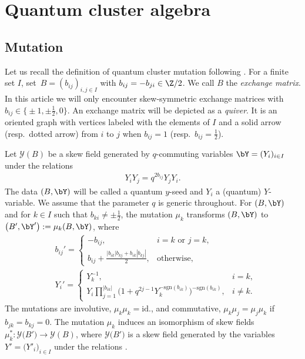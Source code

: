 \section{Quantum cluster algebra}\label{s:qca}

\subsection{Mutation}\label{ss:mutation}

Let us recall the definition of quantum cluster mutation following \cite{FG06}.
For a finite set $I$, set~${B = (b_{ij})_{i,j \in I}}$ with
$b_{ij} = -b_{ji} \in \Z/2$. We call $B$ the {\it exchange matrix}.
In this article we will only encounter skew-symmetric exchange matrices
with $b_{ij} \in \bigl\{\pm 1, \pm \frac{1}{2},0\bigr\}$. An exchange matrix
will be depicted as a {\em quiver}. It is an oriented graph
with vertices labeled with the elements of $I$ and a solid arrow
(resp.\ dotted arrow) from $i$ to $j$ when $b_{ij}=1$ \big(resp.\
$b_{ij}=\frac{1}{2}$\big).

Let $\mathcal{Y}(B)$ be a skew field generated by $q$-commuting variables
$\bY = (Y_i)_{i \in I}$ under the relations
\begin{align}\label{yyq}
 Y_i Y_j = q^{2b_{ij}} Y_j Y_i.
\end{align}
The data $(B, \bY)$ will be called a quantum $y$-seed and $Y_i$ a (quantum) $Y$-variable.
We assume that the parameter $q$ is generic throughout.
%
For $(B, \bY)$ and for $k \in I$ such that
$b_{ki} \neq \pm \frac{1}{2}$, the mutation $\mu_k$ transforms
$(B, \bY)$ to $\bigl(B', \bY'\bigr) := \mu_k (B,\bY)$, where
\begin{align}\label{muB}
 &b_{ij}' =
 \begin{cases}
 -b_{ij}, & i=k \text{ or } j=k,
 \\
 \displaystyle{b_{ij} + \frac{|b_{ik}| b_{kj} + b_{ik} |b_{kj}|}{2}},
 & \text{otherwise},
 \end{cases}
 \\ \label{muY}
%
 &Y_{i}' =
 \begin{cases}
 Y_k^{-1}, & i=k,
 \\
 \displaystyle{Y_i \prod_{j=1}^{|b_{ik}|}\bigl(1 + q^{2j-1} Y_k^{-\mathrm{sgn}(b_{ik})}\bigr)^{-\mathrm{sgn}(b_{ik})}}, & i \neq k.
 \end{cases}
\end{align}
The mutations are involutive, $\mu_k \mu_k = \mathrm{id.}$, and
commutative, $\mu_k \mu_j = \mu_j \mu_k$ if $b_{jk}=b_{kj}=0$. The
mutation $\mu_k$ induces an isomorphism of skew fields
$\mu_k^{\ast}\colon \mathcal{Y}\bigl(B'\bigr) \to \mathcal{Y}(B)$, where
$\mathcal{Y}\bigl(B'\bigr)$ is a skew field generated by the variables
$Y'=\bigl(Y'_i\bigr)_{i\in I}$ under the relations
.

